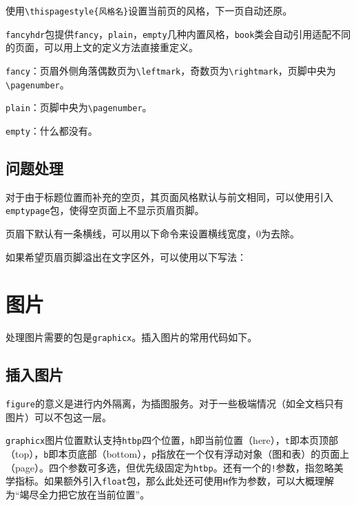 \documentclass[10pt,openany]{book}
\begin{document}
\begin{sloppypar}
    使用\texttt{\textbackslash{}thispagestyle\{风格名\}}设置当前页的风格，下一页自动还原。

    \texttt{fancyhdr}包提供\texttt{fancy}，\texttt{plain}，\texttt{empty}几种内置风格，\texttt{book}类会自动引用适配不同的页面，可以用上文的定义方法直接重定义。

    \texttt{fancy}：页眉外侧角落偶数页为\texttt{\textbackslash{}leftmark}，奇数页为\texttt{\textbackslash{}rightmark}，页脚中央为\texttt{\textbackslash{}pagenumber}。

    \texttt{plain}：页脚中央为\texttt{\textbackslash{}pagenumber}。

    \texttt{empty}：什么都没有。

    \section{问题处理}

    对于由于标题位置而补充的空页，其页面风格默认与前文相同，可以使用引入\texttt{emptypage}包，使得空页面上不显示页眉页脚。

    页眉下默认有一条横线，可以用以下命令来设置横线宽度，0为去除。

    

    如果希望页眉页脚溢出在文字区外，可以使用以下写法：

    

    \chapter{图片}

    处理图片需要的包是\texttt{graphicx}。插入图片的常用代码如下。

    \section{插入图片}

    

    \texttt{figure}的意义是进行内外隔离，为插图服务。对于一些极端情况（如全文档只有图片）可以不包这一层。

    \texttt{graphicx}图片位置默认支持\texttt{htbp}四个位置，\texttt{h}即当前位置（here），\texttt{t}即本页顶部（top），\texttt{b}即本页底部（bottom），\texttt{p}指放在一个仅有浮动对象（图和表）的页面上（page）。四个参数可多选，但优先级固定为\texttt{htbp}。还有一个的\texttt{!}参数，指忽略美学指标。如果额外引入\texttt{float}包，那么此处还可使用\texttt{H}作为参数，可以大概理解为“竭尽全力把它放在当前位置”。


\end{sloppypar}
\end{document}
